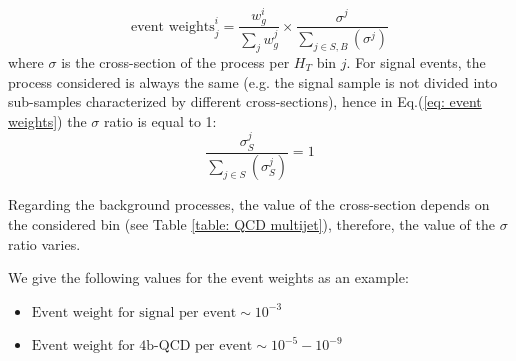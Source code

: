 
\begin{equation}
	\text{event weights}^i_j =\frac{w_g^i}{\sum_j w_g^j} \times \frac{\sigma^j}{\sum_{j\in S,B}(\sigma^j)}
 \label{eq: event weights}
\end{equation}
\noindent where $\sigma$ is the cross-section of the process per $H_T$ bin $j$. For signal events, the process considered is always the same (e.g. the signal sample is not divided into sub-samples characterized by different cross-sections), hence in Eq.(\ref{eq: event weights}) the $\sigma$ ratio is equal to 1:
\begin{equation}
	\frac{\sigma_S^j}{\sum_{j\in S}(\sigma_S^j)}=1
\end{equation}

Regarding the background processes, the value of the cross-section depends on the considered \Ht bin (see Table \ref{table: QCD  multijet}), therefore, the value of the $\sigma$ ratio varies.

\vspace{0.1 cm}

\noindent We give the following values for the event weights as an example:

\begin{itemize}
    \item $\text{Event weight for signal per event} \sim 10^{-3}$
    \item $\text{Event weight for 4b-QCD per event} \sim 10^{-5}-10^{-9}$
\end{itemize}

